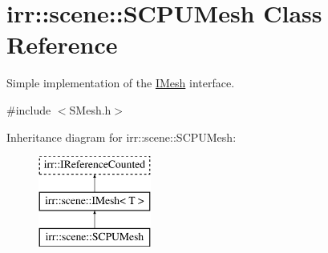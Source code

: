 \hypertarget{classirr_1_1scene_1_1SCPUMesh}{}\section{irr\+:\+:scene\+:\+:S\+C\+P\+U\+Mesh Class Reference}
\label{classirr_1_1scene_1_1SCPUMesh}


Simple implementation of the \hyperlink{classirr_1_1scene_1_1IMesh}{I\+Mesh} interface.  




{\ttfamily \#include $<$S\+Mesh.\+h$>$}

Inheritance diagram for irr\+:\+:scene\+:\+:S\+C\+P\+U\+Mesh\+:\begin{figure}[H]
\begin{center}
\leavevmode
\includegraphics[height=3.000000cm]{classirr_1_1scene_1_1SCPUMesh}
\end{center}
\end{figure}
